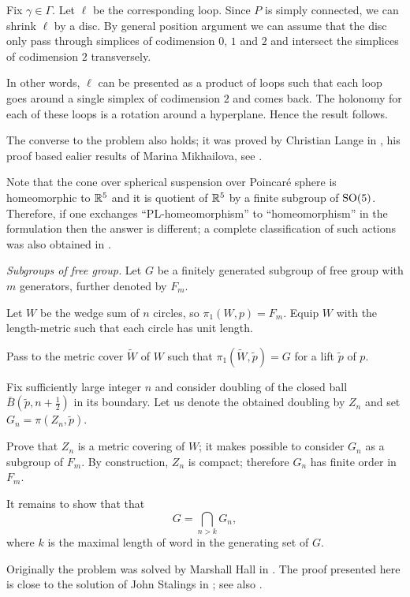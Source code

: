 Fix $\gamma\in\Gamma$. 
Let $\ell$ be the corresponding loop.
Since $P$ is simply connected, we can shrink $\ell$ by a disc.
By general position argument we can assume that the disc 
only pass through simplices of codimension $0$, $1$ and $2$
and intersect the simplices of codimension $2$ transversely.

In other words, $\ell$ can be presented as a product of 
loops such that each loop goes around a single simplex of codimension $2$ and comes back.
The holonomy for each of these loops is a rotation around a hyperplane.
Hence the result follows.

The converse to the problem also holds;
it was proved by Christian Lange in \cite{lange},
his proof based ealier results of 
Marina Mikhailova, see \cite{mikhailova}.

Note that the cone over spherical suspension over Poincar\'e sphere is homeomorphic to $\mathbb{R}^5$ and it is quotient of $\mathbb{R}^5$ by a finite subgroup of $\mathrm{SO}(5)$. 
Therefore, if one exchanges ``PL-homeomorphism'' to ``homeomorphism'' in the formulation then the answer is different; 
a complete classification of such actions was also obtained in \cite{lange}.

\textit{Subgroups of free group.}
Let $G$ be a finitely generated subgroup of free group with $m$ generators, further denoted by $F_m$.

Let $W$ be the wedge sum of $n$ circles, 
so  $\pi_1(W,p)=F_m$.
Equip $W$ with the length-metric 
such that each circle has unit length.

Pass to the metric cover $\tilde W$ of $W$ 
such that  $\pi_1(\tilde W,\tilde p)=G$ 
for a lift $\tilde p$ of $p$.

Fix sufficiently large integer $n$ and consider doubling of the closed ball $\bar B(\tilde p,n+\frac12)$ in its boundary.
Let us denote the obtained doubling by $Z_n$ and set $G_n=\pi(Z_n,\tilde p)$.

Prove that $Z_n$ is a metric covering of $W$;
it makes possible to consider $G_n$ as a subgroup of $F_m$.
By construction, $Z_n$ is compact;
therefore $G_n$ has finite order in $F_m$.


It remains to show that that 
\[G=\bigcap_{n>k} G_n,\]
where $k$ is the maximal length of word in the generating set of $G$.

 
Originally the problem was solved by Marshall Hall in \cite{hall}.
The proof presented here is close to the solution of John Stalings in \cite{stallings};
see also \cite{wilton}.

